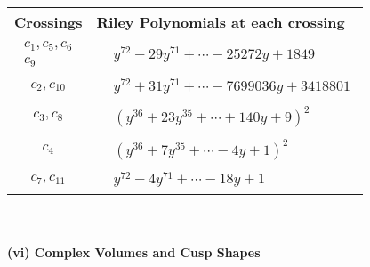 \documentclass[1p]{elsarticle_modified}
\theoremstyle{definition}
\begin{document}
\begin{tabular}{m{50pt}|m{274pt}}
Crossings & \hspace{64pt}Riley Polynomials at each crossing \\
\hline $$\begin{aligned}c_{1},c_{5},c_{6}\\c_{9}\end{aligned}$$&$\begin{aligned}
&y^{72}-29 y^{71}+\cdots-25272 y+1849
\end{aligned}$\\
\hline $$\begin{aligned}c_{2},c_{10}\end{aligned}$$&$\begin{aligned}
&y^{72}+31 y^{71}+\cdots-7699036 y+3418801
\end{aligned}$\\
\hline $$\begin{aligned}c_{3},c_{8}\end{aligned}$$&$\begin{aligned}
&(y^{36}+23 y^{35}+\cdots+140 y+9)^{2}
\end{aligned}$\\
\hline $$\begin{aligned}c_{4}\end{aligned}$$&$\begin{aligned}
&(y^{36}+7 y^{35}+\cdots-4 y+1)^{2}
\end{aligned}$\\
\hline $$\begin{aligned}c_{7},c_{11}\end{aligned}$$&$\begin{aligned}
&y^{72}-4 y^{71}+\cdots-18 y+1
\end{aligned}$\\
\hline
\end{tabular}\\~\\
\newpage\flushleft \textbf{(vi) Complex Volumes and Cusp Shapes}
\end{document}

